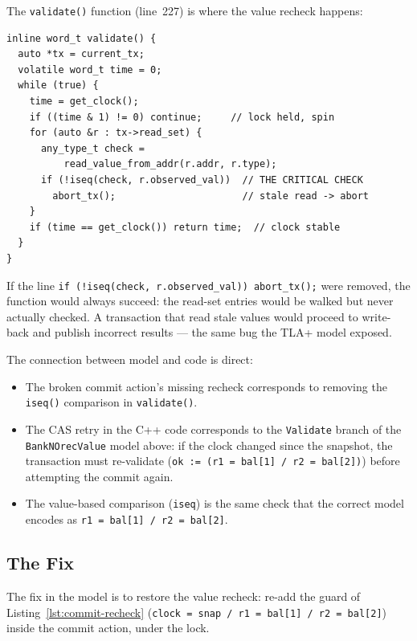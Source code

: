 The \texttt{validate()} function (line~227) is where the value recheck
happens:

\begin{lstlisting}[caption={The value validation that the broken model omitted.}]
inline word_t validate() {
  auto *tx = current_tx;
  volatile word_t time = 0;
  while (true) {
    time = get_clock();
    if ((time & 1) != 0) continue;     // lock held, spin
    for (auto &r : tx->read_set) {
      any_type_t check =
          read_value_from_addr(r.addr, r.type);
      if (!iseq(check, r.observed_val))  // THE CRITICAL CHECK
        abort_tx();                      // stale read -> abort
    }
    if (time == get_clock()) return time;  // clock stable
  }
}
\end{lstlisting}

If the line \texttt{if (!iseq(check, r.observed\_val)) abort\_tx();}
were removed, the function would always succeed: the read-set entries
would be walked but never actually checked.  A transaction that read
stale values would proceed to write-back and publish incorrect results
--- the same bug the TLA+ model exposed.

The connection between model and code is direct:

\begin{itemize}
  \item The broken commit action's missing recheck corresponds to
        removing the \texttt{iseq()} comparison in
        \texttt{validate()}.
  \item The CAS retry in the C++ code corresponds to the
        \texttt{Validate} branch of the \texttt{BankNOrecValue} model
        above: if the clock changed since the snapshot, the transaction
        must re-validate (\texttt{ok := (r1 = bal[1] /\ r2 = bal[2])})
        before attempting the commit again.
  \item The value-based comparison (\texttt{iseq}) is the same check
        that the correct model encodes as
        \texttt{r1 = bal[1] /\ r2 = bal[2]}.
\end{itemize}

\subsection{The Fix}

The fix in the model is to restore the value recheck: re-add the guard of
Listing~\ref{lst:commit-recheck}
(\texttt{clock = snap /\ r1 = bal[1] /\ r2 = bal[2]}) inside the commit
action, under the lock.

